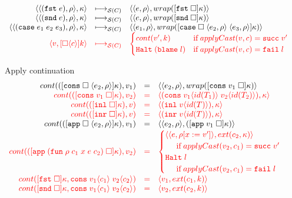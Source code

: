 \documentclass[acmsmall,review,anonymous]{acmart}\settopmatter{printfolios=true,printccs=false,printacmref=false}
\newcommand{\funrule}[3]{#1 &=& #2 & #3\\}
\newcommand{\hifunrule}[3]{\highlight{#1} &\highlight{=}& \highlight{#2} & 
\highlight{#3}\\}
\newcommand{\sOOinspect}[3]{\langle\langle#1,#2\rangle,#3\rangle}
\newcommand{\sOOreturn}[2]{\langle#1,#2\rangle}
\newcommand{\sOOhalt}[1]{\mathtt{Halt} \; #1}
\newcommand{\eOOcar}[1]{\mathtt{fst} \; #1}
\newcommand{\eOOcdr}[1]{\mathtt{snd} \; #1}
\newcommand{\eOOcase}[3]{\mathtt{case} \; #1 \; #2 \; #3}
\newcommand{\oOOblame}[1]{\mathtt{blame} \; #1}
\newcommand{\rOOsucc}[1]{\mathtt{succ}\;#1}
\newcommand{\rOOfail}[1]{\mathtt{fail}\;#1}
\newcommand{\kOOconsI}[3]{[\mathtt{cons} \; \square \; \langle#1,#2\rangle ]#3}
\newcommand{\kOOconsII}[2]{[\mathtt{cons} \; #1 \; \square]#2}
\newcommand{\kOOinl}[1]{[\mathtt{inl} \; \square]#1}
\newcommand{\kOOinr}[1]{[\mathtt{inr} \; \square]#1}
\newcommand{\kOOappI}[3]{
	[\mathtt{app} \; \square \; \langle#1,#2\rangle ]#3
}
\newcommand{\kOOappII}[2]{
	[\mathtt{app} \; #1 \; \square]#2}
\newcommand{\kOOcar}[1]{[\mathtt{fst} \; \square]#1}
\newcommand{\kOOcdr}[1]{[\mathtt{snd} \; \square]#1}
\newcommand{\kOOcaseI}[4]{
	[\mathtt{case} \; \square \; \langle#1,#3\rangle \; \langle#2,#3\rangle ]#4}
\newcommand{\kOOcast}[2]{
	[\square \langle #1 \rangle]#2}
\newcommand{\hcvOOfun}[5]{\mathtt{fun} \; #2 \; #1 \; #3 \; #4 \; #5}
\newcommand{\hcvOOcons}[4]{\mathtt{cons}\;#1\langle#2\rangle\;#3\langle#4\rangle}
\newcommand{\hcvOOinl}[2]{\mathtt{inl}\;#1\langle#2\rangle}
\newcommand{\hcvOOinr}[2]{\mathtt{inr}\;#1\langle#2\rangle}
\newcommand{\sidecond}[1]{\text{if}\;#1}
\newcommand{\redruleS}[3]{#1 & \longmapsto_{\mathcal{S}(C)} & #2 & #3\\}
\newcommand{\hiredruleS}[3]{\highlight{#1} & 
\highlight{\longmapsto_{\mathcal{S}(C)}} & \highlight{#2} & \highlight{#3} \\}
\newcommand{\continue}[2]{cont(#2,#1)}
\newcommand{\highlight}[1]{{\color{red} #1}}
\begin{document}
\begin{figure}
\[\begin{array}{rclr}
	\redruleS{
		\sOOinspect{(\eOOcar{e})}{\rho}{\kappa}}{
		\sOOinspect{e}{\rho}{wrap(\kOOcar{\kappa})}}{}
	
	\redruleS{
		\sOOinspect{(\eOOcdr{e})}{\rho}{\kappa}}{
		\sOOinspect{e}{\rho}{wrap(\kOOcdr{\kappa})}}{}
	
	\redruleS{
		\sOOinspect{(\eOOcase{e_1}{e_2}{e_3})}{\rho}{\kappa}}{
		\sOOinspect{e_1}{\rho}{wrap(\kOOcaseI{e_2}{e_3}{\rho}{\kappa})}}{}
	\hiredruleS{
		\sOOreturn{v}{\kOOcast{c}{k}}
	}{
	\begin{cases}
	\continue{k}{v'} & \sidecond{applyCast(v,c) = \rOOsucc{v'}} 
	\\
	\sOOhalt{(\oOOblame{l})} & \sidecond{applyCast(v,c) = \rOOfail{l}}
	\end{cases}
	}{}
	\end{array}
	\]
	
	Apply continuation
	\[
	\begin{array}{rclr}
	

\funrule{
	\continue{v_1}{(\kOOconsI{e_2}{\rho}{\kappa})}}{
	\sOOinspect{e_2}{\rho}{wrap(\kOOconsII{v_1}{\kappa})}}{}

\hifunrule{
	\continue{v_2}{(\kOOconsII{v_1}{\kappa})}}{
	\sOOreturn{(\hcvOOcons{v_1}{id(T_1)}{v_2}{id(T_2)})}{\kappa}}{}

\hifunrule{
	\continue{v}{(\kOOinl{\kappa})}}{
	\sOOreturn{(\hcvOOinl{v}{id(T)})}{\kappa}}{}

\hifunrule{
	\continue{v}{(\kOOinr{\kappa})}}{
	\sOOreturn{(\hcvOOinr{v}{id(T)})}{\kappa}}{}

\funrule{
	\continue{v_1}{(\kOOappI{e_2}{\rho}{\kappa})}}{
	\sOOinspect{e_2}{\rho}{(\kOOappII{v_1}{\kappa})}}{}


\hifunrule{
	\continue{v_2}{(\kOOappII{(\hcvOOfun{c_1}{\rho}{x}{e}{c_2})}{\kappa})}}{
\begin{cases}
	\sOOinspect{e}{\rho[x:=v']}{ext(c_2,\kappa)} \\
\;\;\;\;\;\sidecond{applyCast(v_2,c_1) = \rOOsucc{v'}}
\\
\sOOhalt{l} \\
\;\;\;\;\;\sidecond{applyCast(v_2,c_1) = \rOOfail{l}}
\end{cases}
}{}

\hifunrule{
	\continue{\hcvOOcons{v_1}{c_1}{v_2}{c_2}}{
		\kOOcar{\kappa}
	}
}{
	\sOOreturn{v_1}{ext(c_1,k)}
}{}
\hifunrule{
	\continue{\hcvOOcons{v_1}{c_1}{v_2}{c_2}}{
		\kOOcdr{\kappa}
	}
}{
	\sOOreturn{v_2}{ext(c_2,k)}
}{}


\end{array}\]
\end{figure}
\end{document}
